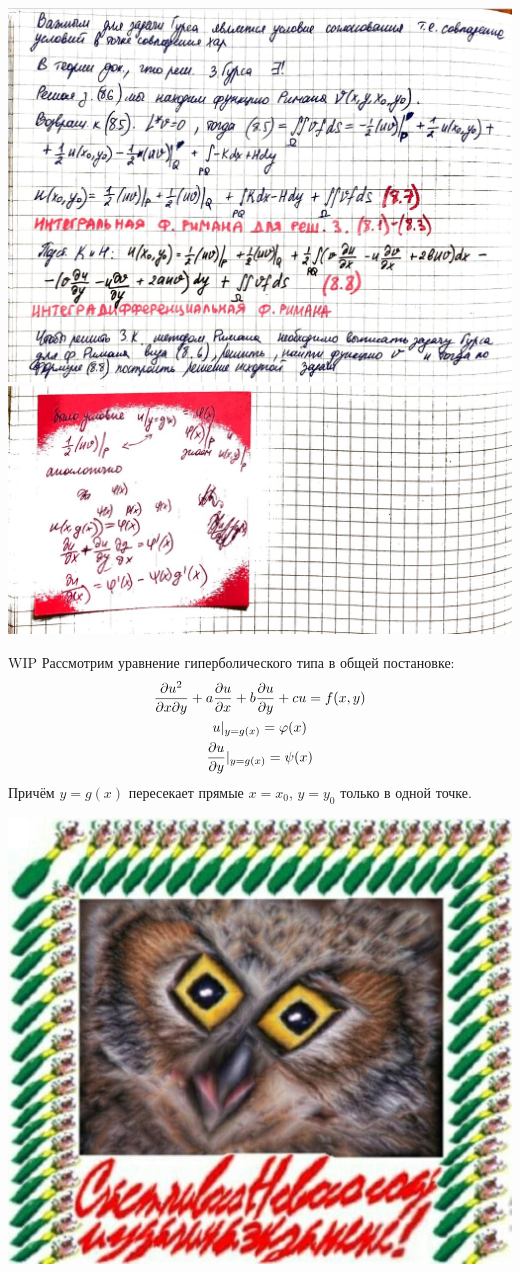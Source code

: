 \documentclass[../main.tex]{subfiles}
\begin{document}
\includegraphics[scale=0.7]{Liza_2.7.4.jpg}
\includegraphics[scale=0.7]{Liza_2.7.5.jpg}

WIP
Рассмотрим уравнение гиперболического типа в общей постановке:
\begin{gather}
    \label{eq:2.7.1}
    \pderivtwo{u}{x}{y} + a\pderiv{u}{x} +b\pderiv{u}{y} + cu = f(x,y)\\
    \label{eq:2.7.2}
    u|_{y=g(x)} = \varphi(x)\\
    \pderiv{u}{y}|_{y=g(x)} = \psi(x)
\end{gather}
Причём $y=g(x)$ пересекает прямые $x=x_0$, $y=y_0$ только в одной точке.

\includegraphics[scale=0.4]{example.jpg}
\end{document}
